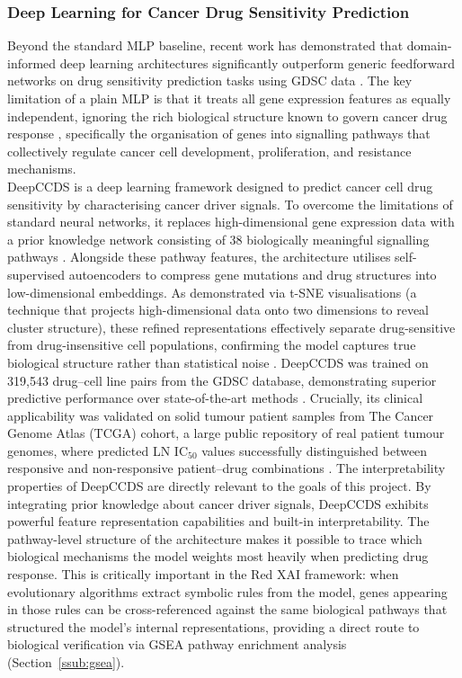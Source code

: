 \subsubsection{Deep Learning for Cancer Drug Sensitivity Prediction}
\label{ssub:dl-drug-sensitivity}
Beyond the standard MLP baseline, recent work has demonstrated that domain-informed deep learning
architectures significantly outperform generic feedforward networks on drug sensitivity prediction
tasks using GDSC data \cite{Partin2023,Wu2025}. The key limitation of a plain MLP is that it treats
all gene expression features as equally independent, ignoring the rich biological structure known to
govern cancer drug response \cite{Wu2025}, specifically the organisation of genes into signalling
pathways that collectively regulate cancer cell development, proliferation, and resistance mechanisms.
\\
DeepCCDS \cite{Wu2025} is a deep learning framework designed to predict cancer cell drug sensitivity
by characterising cancer driver signals. To overcome the limitations of standard neural networks, it
replaces high-dimensional gene expression data with a prior knowledge network consisting of 38
biologically meaningful signalling pathways \cite{Wu2025}. Alongside these pathway features, the
architecture utilises self-supervised autoencoders to compress gene mutations and drug structures
into low-dimensional embeddings. As demonstrated via t-SNE visualisations (a technique that projects
high-dimensional data onto two dimensions to reveal cluster structure), these refined representations
effectively separate drug-sensitive from drug-insensitive cell populations,
confirming the model captures true biological structure rather than statistical noise \cite{Wu2025}.
DeepCCDS was trained on 319,543 drug–cell line pairs from the GDSC database, demonstrating superior
predictive performance over state-of-the-art methods \cite{Wu2025}. Crucially, its clinical
applicability was validated on solid tumour patient samples from The Cancer Genome Atlas (TCGA) cohort, a large public
repository of real patient tumour genomes, where predicted
LN IC$_{50}$ values successfully distinguished between responsive and non-responsive patient–drug
combinations \cite{Wu2025}. The interpretability properties of DeepCCDS are directly relevant to the
goals of this project. By integrating prior knowledge about cancer driver signals, DeepCCDS exhibits
powerful feature representation capabilities and built-in interpretability. The pathway-level
structure of the architecture makes it possible to trace which biological mechanisms the model
weights most heavily when predicting drug response. This is critically important in the Red XAI
framework: when evolutionary algorithms extract symbolic rules from the model, genes appearing in
those rules can be cross-referenced against the same biological pathways that structured the model's
internal representations, providing a direct route to biological verification via GSEA pathway
enrichment analysis (Section~\ref{ssub:gsea}).

